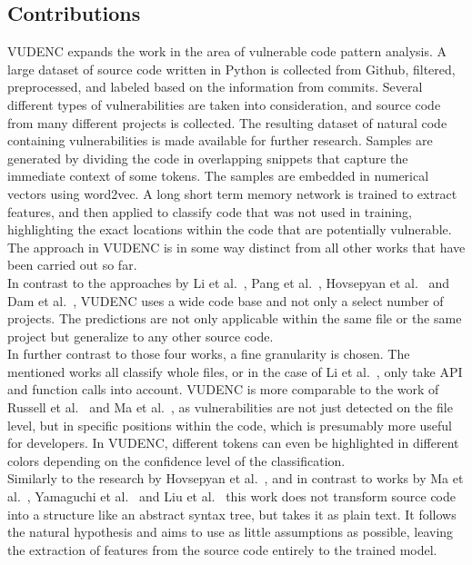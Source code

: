 \documentclass[
a4paper,
pagesize,
pdftex,
12pt,
ngerman,
fleqn,
final,
]{scrartcl}
\begin{document}
	
	\subsection{Contributions}
	
	VUDENC expands the work in the area of vulnerable code pattern analysis. A large dataset of source code written in Python is collected from Github, filtered, preprocessed, and labeled based on the information from commits. Several different types of vulnerabilities are taken into consideration, and source code from many different projects is collected. The resulting dataset of natural code containing vulnerabilities is made available for further research. Samples are generated by dividing the code in overlapping snippets that capture the immediate context of some tokens. The samples are embedded in numerical vectors using word2vec. A long short term memory network is trained to extract features, and then applied to classify code that was not used in training, highlighting the exact locations within the code that are potentially vulnerable. The approach in VUDENC is in some way distinct from all other works that have been carried out so far.\\
	In contrast to the approaches by Li et al.~\cite{Li.2018}, Pang et al.~\cite{Pang.2015}, Hovsepyan et al.~\cite{Hovsepyan.2012} and Dam et al.~\cite{Dam.2017}, VUDENC uses a wide code base and not only a select number of projects. The predictions are not only applicable within the same file or the same project but generalize to any other source code.\\
	In further contrast to those four works, a fine granularity is chosen. The mentioned works all classify whole files, or in the case of Li et al.~\cite{Li.2018}, only take API and function calls into account. VUDENC is more comparable to the work of Russell et al.~\cite{Russell.2018} and Ma et al.~\cite{Ma.2017}, as vulnerabilities are not just detected on the file level, but in specific positions within the code, which is presumably more useful for developers. In VUDENC, different tokens can even be highlighted in different colors depending on the confidence level of the classification.\\
	Similarly to the research by Hovsepyan et al.~\cite{Hovsepyan.2012}, and in contrast to works by Ma et al.~\cite{Ma.2017}, Yamaguchi et al.~\cite{Yamaguchi.2012} and Liu et al.~\cite{Liu.2018}
	this work does not transform source code into a structure like an abstract syntax tree, but takes it as plain text. It follows the natural hypothesis and aims to use as little assumptions as possible, leaving the extraction of features from the source code entirely to the trained model.\\
\end{document}
